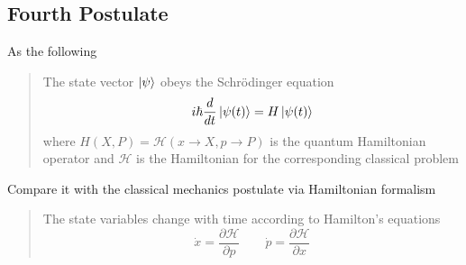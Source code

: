\documentclass[../../../main.tex]{subfiles}
\begin{document}
\subsection{Fourth Postulate}
As the following
\begin{quotation}
    The state vector $\ket{\psi}$ obeys the Schrödinger equation
    \begin{equation*}
        i\hbar \frac{d }{dt }\ket{\psi(t )}= H \ket{\psi(t)}
    \end{equation*}
    where $H(X,P)=\mathcal{H }(x\rightarrow X, p\rightarrow P  )$ is the quantum Hamiltonian operator and $\mathcal{H }$ is the Hamiltonian for the corresponding classical problem
\end{quotation}
Compare it with the classical mechanics postulate via Hamiltonian formalism
\begin{quotation}
The state variables change with time according to Hamilton's equations
\begin{equation*}
    \dot{x}=\frac{\partial \mathcal{H }}{\partial p}\qquad \dot{p }=\frac{\partial \mathcal{H }}{\partial x}
\end{equation*}
\end{quotation}
\end{document}
